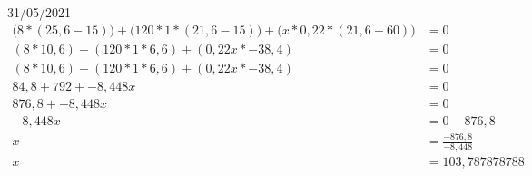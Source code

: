 \documentclass{SchoolBook}
\begin{document}
\begin{day}{31/05/2021}
        \begin{align*}
            \Big(8            * (25,6 - 15)\Big) +
            \Big(120   * 1    * (21,6 - 15)\Big) +
            \Big(x     * 0,22 * (21,6 - 60)\Big) &= 0                     \\
                (8            * 10,6           ) +
                (120   * 1    * 6,6            ) +
                (0,22x        * -38,4          ) &= 0                     \\
                (8            * 10,6           ) +
                (120   * 1    * 6,6            ) +
                (0,22x        * -38,4          ) &= 0                     \\
                            84,8 + 792 + -8,448x &= 0                     \\
                            876,8      + -8,448x &= 0                     \\
                                         -8,448x &= 0 - 876,8             \\
                                               x &= \frac{-876,8}{-8,448} \\
                                               x &= 103,787878788
        \end{align*}
    \end{day}
    
\end{document}
